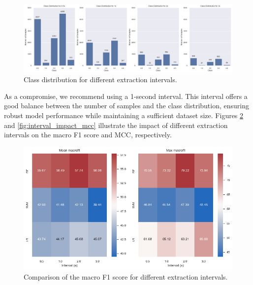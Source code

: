 \documentclass[twocolumn]{class}
\begin{document}
\begin{figure}[htbp]
    \centering
    \includegraphics[width=1\textwidth]{./images/interval_class_distribution.png}
    \caption{Class distribution for different extraction intervals.}
    \label{fig:interval_class_distribution}
\end{figure}

As a compromise, we recommend using a 1-second interval. This interval offers a good balance between 
the number of samples and the class distribution, ensuring robust model performance while maintaining a 
sufficient dataset size. Figures \ref{fig:interval_impact_macrof1} and \ref{fig:interval_impact_mcc} illustrate the impact of 
different extraction intervals on the macro F1 score and MCC, respectively.

\begin{figure}[H]
    \centering
    \includegraphics[width=1\columnwidth]{./images/interval_impact_macrof1.png}
    \caption{Comparison of the macro F1 score for different extraction intervals.}
    \label{fig:interval_impact_macrof1}
\end{figure}
\end{document}
